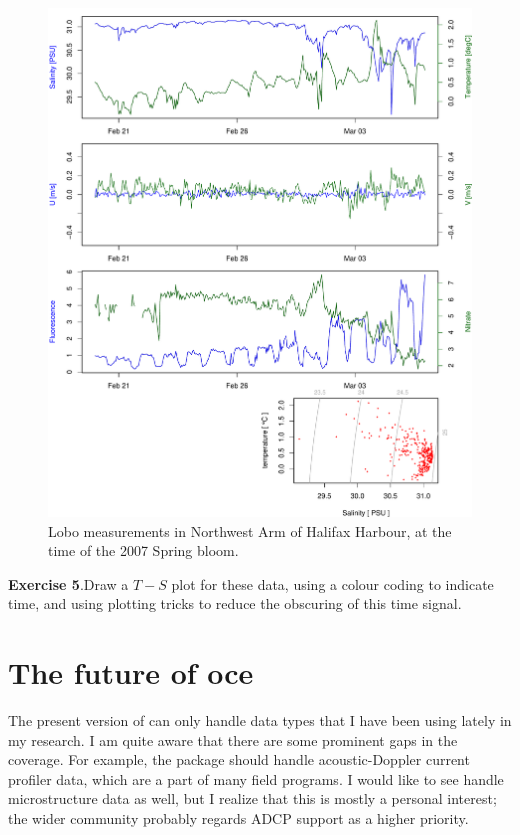\documentclass{article}
\newcommand{\workedexercise}[2]{
	\vspace{1ex}
	\begin{boxedminipage}[c]{0.95\linewidth}
		{\textbf{Exercise #1}.\hspace{1em}#2}
	\end{boxedminipage}
	\vspace{1ex}
}
\begin{document}
\begin{figure}
\begin{center}
\includegraphics{oce-lobofig}
\end{center}
\caption{Lobo measurements in Northwest Arm of Halifax Harbour, at
the time of the 2007 Spring bloom.}
\label{fig:lobo}
\end{figure}

\workedexercise{5}{Draw a $T-S$ plot for these data, using a colour coding to indicate time,
and using plotting tricks to reduce the obscuring of this time signal.}


\section{The future of oce}

The present version of \verb@oce@ can only handle data types that I have been using lately in my
research. I am quite aware that there are some prominent gaps in the coverage. For example, the
package should handle acoustic-Doppler current profiler data, which are a part of many field
programs. I would like to see \verb@oce@ handle microstructure data as well, but I realize that this
is mostly a personal interest; the wider community probably regards ADCP support as a higher
priority.
\end{document}
